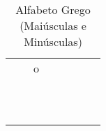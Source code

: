 \begin{table}[H]
	\centering
	\caption{Alfabeto Grego (Maiúsculas e Minúsculas)}
	\label{tab:alfa_grego}
	\begin{tabular}{p{0.5cm} p{2.25cm} p{0.5cm} p{2.25cm} p{0.5cm} p{2.25cm} p{0.5cm} p{2.25cm}}
		\toprule
		\X\alpha        &\X\theta       &\X o           &\X\tau         \\[0.5em]
		\X\beta         &\X\vartheta    &\X\pi          &\X\upsilon     \\[0.5em]
		\X\gamma        &\X\gamma       &\X\varpi       &\X\phi         \\[0.5em]
		\X\delta        &\X\kappa       &\X\rho         &\X\varphi      \\[0.5em]
		\X\epsilon      &\X\lambda      &\X\varrho      &\X\chi         \\[0.5em]
		\X\varepsilon   &\X\mu          &\X\sigma       &\X\psi         \\[0.5em]
		\X\zeta         &\X\nu          &\X\varsigma    &\X\omega       \\[0.5em]
		\X\eta          &\X\xi                                          \\[0.5em]
		\\[0.5em]
		\X\Gamma        &\X\Lambda      &\X\Sigma       &\X\Psi         \\[0.5em]
		\X\Delta        &\X\Xi          &\X\Upsilon     &\X\Omega       \\[0.5em]
		\X\Theta        &\X\Pi          &\X\Phi \\
		\bottomrule
	\end{tabular}
\end{table}

